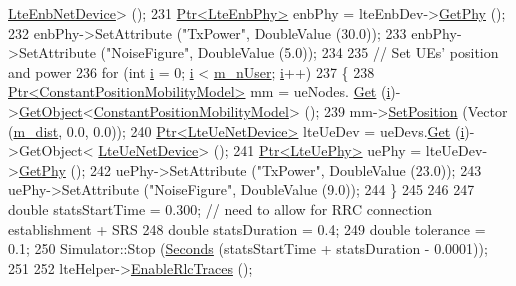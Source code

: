 \begin{DoxyCode}
      \hyperlink{classns3_1_1LteEnbNetDevice}{LteEnbNetDevice}> ();
231   \hyperlink{classns3_1_1Ptr}{Ptr<LteEnbPhy>} enbPhy = lteEnbDev->\hyperlink{classns3_1_1LteEnbNetDevice_a58db72130e0740f16a5e03b22e4a10a4}{GetPhy} ();
232   enbPhy->SetAttribute (\textcolor{stringliteral}{"TxPower"}, DoubleValue (30.0));
233   enbPhy->SetAttribute (\textcolor{stringliteral}{"NoiseFigure"}, DoubleValue (5.0));
234 
235   \textcolor{comment}{// Set UEs' position and power}
236   \textcolor{keywordflow}{for} (\textcolor{keywordtype}{int} \hyperlink{bernuolliDistribution_8m_a6f6ccfcf58b31cb6412107d9d5281426}{i} = 0; \hyperlink{bernuolliDistribution_8m_a6f6ccfcf58b31cb6412107d9d5281426}{i} < \hyperlink{classLenaRrFfMacSchedulerTestCase_a8973c6783abfcb4f86d2eed09f96771e}{m\_nUser}; \hyperlink{bernuolliDistribution_8m_a6f6ccfcf58b31cb6412107d9d5281426}{i}++)
237     \{
238       \hyperlink{classns3_1_1Ptr}{Ptr<ConstantPositionMobilityModel>} mm = ueNodes.
      \hyperlink{classns3_1_1NodeContainer_a9ed96e2ecc22e0f5a3d4842eb9bf90bf}{Get} (\hyperlink{bernuolliDistribution_8m_a6f6ccfcf58b31cb6412107d9d5281426}{i})->\hyperlink{classns3_1_1Object_a13e18c00017096c8381eb651d5bd0783}{GetObject}<\hyperlink{classns3_1_1ConstantPositionMobilityModel}{ConstantPositionMobilityModel}> ();
239       mm->\hyperlink{classns3_1_1MobilityModel_ac584b3d5a309709d2f13ed6ada1e7640}{SetPosition} (Vector (\hyperlink{classLenaRrFfMacSchedulerTestCase_acfeb04f33db41e95247adca7a4bef11d}{m\_dist}, 0.0, 0.0));
240       \hyperlink{classns3_1_1Ptr}{Ptr<LteUeNetDevice>} lteUeDev = ueDevs.\hyperlink{classns3_1_1NetDeviceContainer_a677d62594b5c9d2dea155cc5045f4d0b}{Get} (\hyperlink{bernuolliDistribution_8m_a6f6ccfcf58b31cb6412107d9d5281426}{i})->GetObject<
      \hyperlink{classns3_1_1LteUeNetDevice}{LteUeNetDevice}> ();
241       \hyperlink{classns3_1_1Ptr}{Ptr<LteUePhy>} uePhy = lteUeDev->\hyperlink{classns3_1_1LteUeNetDevice_a2a9940a1e457a8bf3dae87fed4199c7a}{GetPhy} ();
242       uePhy->SetAttribute (\textcolor{stringliteral}{"TxPower"}, DoubleValue (23.0));
243       uePhy->SetAttribute (\textcolor{stringliteral}{"NoiseFigure"}, DoubleValue (9.0));
244     \}
245 
246 
247   \textcolor{keywordtype}{double} statsStartTime = 0.300; \textcolor{comment}{// need to allow for RRC connection establishment + SRS}
248   \textcolor{keywordtype}{double} statsDuration = 0.4;
249   \textcolor{keywordtype}{double} tolerance = 0.1;
250   Simulator::Stop (\hyperlink{group__timecivil_ga33c34b816f8ff6628e33d5c8e9713b9e}{Seconds} (statsStartTime + statsDuration - 0.0001));
251 
252   lteHelper->\hyperlink{classns3_1_1LteHelper_abadfdd04d30b261e9b6f0846b4784928}{EnableRlcTraces} ();

\end{DoxyCode}
